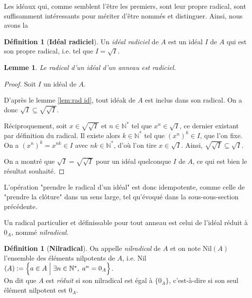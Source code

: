 \documentclass[10pt, twoside]{article}
\theoremstyle{plain}
\theoremstyle{definition}
\newtheorem{definition}[theorem]{Définition}
\theoremstyle{plain}
\theoremstyle{plain}
\newtheorem{lemma}[theorem]{Lemme}
\theoremstyle{definition}
\theoremstyle{remark}
\begin{document}
Les idéaux qui, comme semblent l'être les premiers, sont leur propre radical, sont suffisamment intéressants pour mériter d'être nommés et distinguer. Ainsi, nous avons la

\begin{definition}[\textbf{Idéal radiciel}]\label{def:id rad}
    Un \textit{idéal radiciel} de $A$ est un idéal $I$ de $A$ qui est son propre radical, i.e. tel que $I = \sqrt{I}$.
\end{definition}

\begin{lemma}\label{lem:rad rad}
    Le radical d'un idéal d'un anneau est radiciel.
\end{lemma}

\begin{proof}
    Soit $I$ un idéal de $A$.

    D'après le lemme \ref{lem:rad id}, tout idéak de $A$ est inclus dans son radical. On a donc $\sqrt{I} \subseteq \sqrt{\sqrt{I}}$.

    Réciproquement, soit $x \in \sqrt{\sqrt{I}}$ et $n \in \mathbb{N}^*$ tel que $x^n \in \sqrt{I}$, ce dernier existant par définition du radical. Il existe alors $k \in \mathbb{N}^*$ tel que $(x^n)^k \in I$, que l'on fixe. On a $(x^n)^k = x^{nk} \in I$ avec $nk \in \mathbb{N}^*$, d'où l'on tire $x \in \sqrt{I}$. Ainsi, $\sqrt{\sqrt{I}} \subseteq \sqrt{I}$.

    On a montré que $\sqrt{I} = \sqrt{\sqrt{I}}$ pour un idéal quelconque $I$ de $A$, ce qui est bien le résultat souhaité.
\end{proof}

L'opération "prendre le radical d'un idéal" est donc idempotente, comme celle de "prendre la clôture" dans un sens large, tel qu'évoqué dans la sous-sous-section précédente.

Un radical particulier et définissable pour tout anneau est celui de l'idéal réduit à $0_A$, nommé \textit{nilradical}.

\begin{definition}[\textbf{Nilradical}]\label{def:nilrad}
    On appelle \textit{nilradical} de $A$ et on note Nil$(A)$ l'ensemble des éléments nilpotents de $A$, i.e. Nil$(A) := \Bigl\{a \in A \; \Big| \; \exists n \in \mathbb{N}^*, \; a^n = 0_A \Bigr\}$.\\
    On dit que $A$ est \textit{réduit} si son nilradical est égal à $\{ 0_A \}$, c'est-à-dire si son seul élément nilpotent est $0_A$.
\end{definition}
\end{document}
